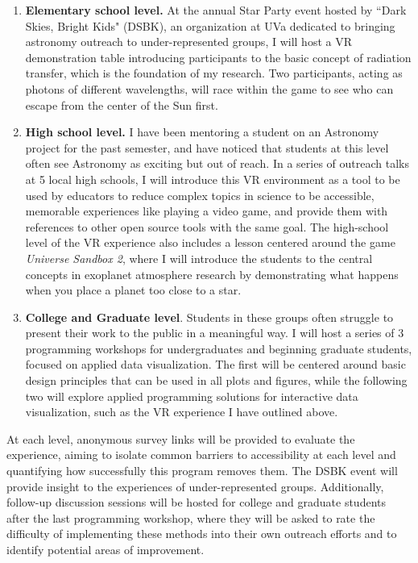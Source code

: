 \documentclass[11pt]{article}
\begin{document}
\noindent
\begin{enumerate}[wide, itemsep=-0.15cm, topsep=0cm, labelindent=0cm]
    \item \textbf{Elementary school level.} At the annual Star Party event hosted by ``Dark Skies, Bright Kids" (DSBK), an organization at UVa dedicated to bringing astronomy outreach to under-represented groups, I will host a VR demonstration table introducing participants to the basic concept of radiation transfer, which is the foundation of my research. Two participants, acting as photons of different wavelengths, will race within the game to see who can escape from the center of the Sun first.
    \item \textbf{High school level.} I have been mentoring a student on an Astronomy project for the past semester, and have noticed that students at this level often see Astronomy as exciting but out of reach. In a series of outreach talks at 5 local high schools, I will introduce this VR environment as a tool to be used by educators to reduce complex topics in science to be accessible, memorable experiences like playing a video game, and provide them with references to other open source tools with the same goal. The high-school level of the VR experience also includes a lesson centered around the game \textit{Universe Sandbox 2}, where I will introduce the students to the central concepts in exoplanet atmosphere research by demonstrating what happens when you place a planet too close to a star.
    \item \textbf{College and Graduate level}. Students in these groups often struggle to present their work to the public in a meaningful way. I will host a series of 3 programming workshops for undergraduates and beginning graduate students, focused on applied data visualization. The first will be centered around basic design principles that can be used in all plots and figures, while the following two will explore applied programming solutions for interactive data visualization, such as the VR experience I have outlined above.
\end{enumerate}

At each level, anonymous survey links will be provided to evaluate the experience, aiming to isolate common barriers to accessibility at each level and quantifying how successfully this program removes them. The DSBK event will provide insight to the experiences of under-represented groups. Additionally, follow-up discussion sessions will be hosted for college and graduate students after the last programming workshop, where they will be asked to rate the difficulty of implementing these methods into their own outreach efforts and to identify potential areas of improvement.
\end{document}
